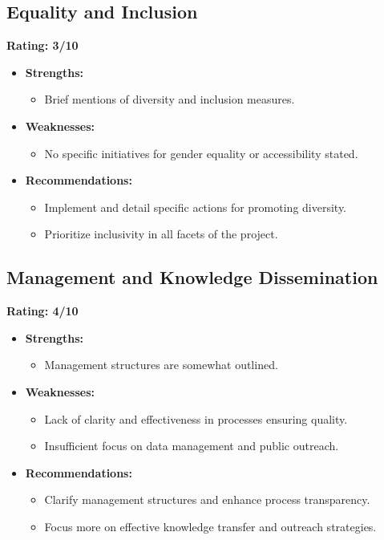 \documentclass{article}
\begin{document}
\subsection{Equality and Inclusion}
\textbf{Rating: 3/10}
\begin{itemize}
    \item \textbf{Strengths:}
    \begin{itemize}
        \item Brief mentions of diversity and inclusion measures.
    \end{itemize}
    \item \textbf{Weaknesses:}
    \begin{itemize}
        \item No specific initiatives for gender equality or accessibility stated.
    \end{itemize}
    \item \textbf{Recommendations:}
    \begin{itemize}
        \item Implement and detail specific actions for promoting diversity.
        \item Prioritize inclusivity in all facets of the project.
    \end{itemize}
\end{itemize}

\subsection{Management and Knowledge Dissemination}
\textbf{Rating: 4/10}
\begin{itemize}
    \item \textbf{Strengths:}
    \begin{itemize}
        \item Management structures are somewhat outlined.
    \end{itemize}
    \item \textbf{Weaknesses:}
    \begin{itemize}
        \item Lack of clarity and effectiveness in processes ensuring quality.
        \item Insufficient focus on data management and public outreach.
    \end{itemize}
    \item \textbf{Recommendations:}
    \begin{itemize}
        \item Clarify management structures and enhance process transparency.
        \item Focus more on effective knowledge transfer and outreach strategies.
    \end{itemize}
\end{itemize}
\end{document}
